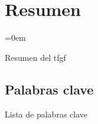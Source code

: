 \newpage
\chapter*{Resumen}
\parindent=0em

Resumen del tfgf




\section*{Palabras clave}

Lista de palabras clave


